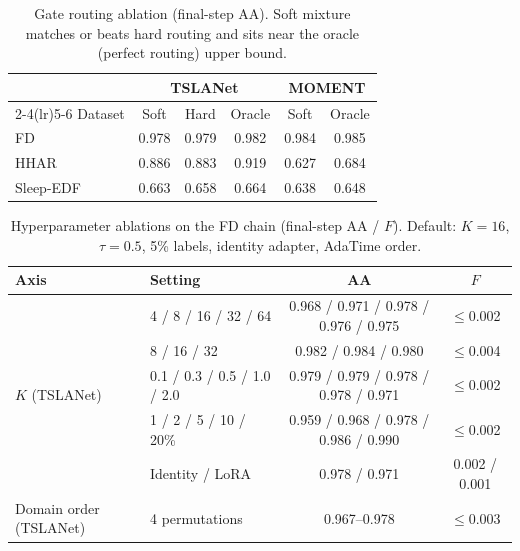 \begin{table}[t]
\centering
\caption{Gate routing ablation (final-step AA). Soft mixture matches or beats
hard routing and sits near the oracle (perfect routing) upper bound.}
\label{tab:gate}
\small
\begin{tabular}{l ccc cc}
\toprule
& \multicolumn{3}{c}{TSLANet} & \multicolumn{2}{c}{MOMENT}\\
\cmidrule(lr){2-4}\cmidrule(lr){5-6}
Dataset & Soft & Hard & Oracle & Soft & Oracle\\
\midrule
FD & 0.978 & 0.979 & 0.982 & 0.984 & 0.985\\
HHAR & 0.886 & 0.883 & 0.919 & 0.627 & 0.684\\
Sleep-EDF & 0.663 & 0.658 & 0.664 & 0.638 & 0.648\\
\bottomrule
\end{tabular}
\end{table}

\begin{table}[t]
\centering
\caption{Hyperparameter ablations on the FD chain (final-step AA / $F$).
Default: $K{=}16$, $\tau{=}0.5$, 5\% labels, identity adapter, AdaTime order.}
\label{tab:hparams}
\small
\begin{tabular}{ll cc}
\toprule
Axis & Setting & AA & $F$\\
\midrule
\multirow{5}{*}{$K$ (TSLANet)} & 4 / 8 / 16 / 32 / 64 & 0.968 / 0.971 / 0.978 / 0.976 / 0.975 & $\leq$0.002\\
\multirow{3}{*}{$K$ (MOMENT)} & 8 / 16 / 32 & 0.982 / 0.984 / 0.980 & $\leq$0.004\\
\multirow{5}{*}{$\tau$ (TSLANet)} & 0.1 / 0.3 / 0.5 / 1.0 / 2.0 & 0.979 / 0.979 / 0.978 / 0.978 / 0.971 & $\leq$0.002\\
\multirow{5}{*}{Label budget (TSLANet)} & 1 / 2 / 5 / 10 / 20\% & 0.959 / 0.968 / 0.978 / 0.986 / 0.990 & $\leq$0.002\\
\multirow{2}{*}{Adapter (TSLANet)} & Identity / LoRA & 0.978 / 0.971 & 0.002 / 0.001\\
\multirow{4}{*}{Domain order (TSLANet)} & 4 permutations & 0.967--0.978 & $\leq$0.003\\
\bottomrule
\end{tabular}
\end{table}

